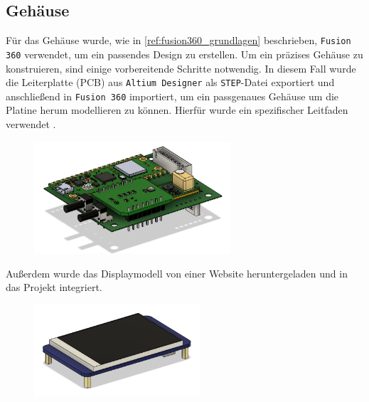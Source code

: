 \begin{inhalt}
\renewcommand*\chapterpagestyle{scrheadings}
\chapter{Gehäuse}

Für das Gehäuse wurde, wie in \ref{ref:fusion360_grundlagen} beschrieben, \texttt{Fusion 360} verwendet, um ein passendes Design zu erstellen.  
Um ein präzises Gehäuse zu konstruieren, sind einige vorbereitende Schritte notwendig.  
In diesem Fall wurde die Leiterplatte (PCB) aus \texttt{Altium Designer} als \texttt{STEP}-Datei exportiert und anschließend in \texttt{Fusion 360} importiert,  
um ein passgenaues Gehäuse um die Platine herum modellieren zu können.  
Hierfür wurde ein spezifischer Leitfaden verwendet \cite{artikel_pcb_way}.


\begin{figure}[!htb]
\centering
\includegraphics[width=0.65\textwidth]{files/Thomas/pics/geheause/pcb_fusion.png}
\caption[Bildbezeichnung für Abbildungsverzeichnis]{}
\label{fig:pcb_v2}
\end{figure}


Außerdem wurde das Displaymodell von einer Website \cite{3d_display_website} heruntergeladen und in das Projekt integriert.


\begin{figure}[!htb]
\centering
\includegraphics[width=0.55\textwidth]{files/Thomas/pics/geheause/display_fusion.png}
\caption[Bildbezeichnung für Abbildungsverzeichnis]{}
\label{fig:display_3d}
\end{figure}


\end{inhalt}
